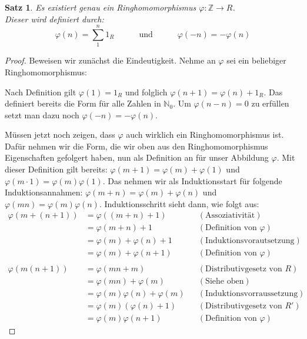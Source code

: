 \documentclass{article}
\newtheorem*{satz}{Satz}
\theoremstyle{definition}
\theoremstyle{remark}
\begin{document}
\begin{satz}
Es existiert genau ein Ringhomomorphismus $\varphi: \mathbb Z \to R$. \\
Dieser wird definiert durch:
\[\varphi(n)=\sum_1^n 1_R \hspace{3em} \text{und} \hspace{3em} \varphi(-n)=-\varphi(n)\]
\end{satz}
\begin{proof} Beweisen wir zunächst die Eindeutigkeit. Nehme an $\varphi$ sei ein beliebiger
Ringhomomorphismus: 

Nach Definition gilt $\varphi(1)=1_R$ und folglich $\varphi(n+1)=\varphi(n)+1_R$.
Das definiert bereits die Form für alle Zahlen in $\mathbb N_0$. Um $\varphi(n-n)=0$ zu erfüllen setzt man
dazu noch $\varphi(-n)=-\varphi(n)$.

\vspace{0.7em}
Müssen jetzt noch zeigen, dass $\varphi$ auch wirklich ein Ringhomomorphismus ist. Dafür nehmen wir die Form,
die wir oben aus den Ringhomomorphismus Eigenschaften gefolgert haben, nun als Definition an für unser
Abbildung $\varphi$. Mit dieser Definition gilt bereits: $\varphi(m+1)=\varphi(m)+\varphi(1)$ und
$\varphi(m\cdot 1)=\varphi(m)\varphi(1)$. Das nehmen wir als Induktionsstart für folgende Induktionsannahmen:
$\varphi(m+n)=\varphi(m)+\varphi(n)$ und $\varphi(mn)=\varphi(m)\varphi(n)$. Induktionsschritt sieht dann, wie
folgt aus:
\begin{align*}
    \varphi(m+(n+1)) &= \varphi((m+n)+1)    &&(\text{Assoziativität}) \\
                     &= \varphi(m+n)+1      &&(\text{Definition von }\varphi) \\
                     &= \varphi(m)+\varphi(n)+1 &&(\text{Induktionsvorautsetzung}) \\
                     &= \varphi(m)+\varphi(n+1) &&(\text{Definition von }\varphi) \\
                     \\
    \varphi(m(n+1))  &= \varphi(mn+m)       &&(\text{Distributivgesetz von }R) \\
                     &= \varphi(mn)+\varphi(m) &&(\text{Siehe oben}) \\
                     &= \varphi(m)\varphi(n)+\varphi(m) &&(\text{Induktionsvorraussetzung}) \\
                     &= \varphi(m)(\varphi(n)+1) &&(\text{Distributivgesetz von }R') \\
                     &= \varphi(m)\varphi(n+1) &&(\text{Definition von }\varphi)
\end{align*}
\end{proof}
\end{document}
